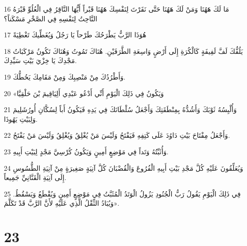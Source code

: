 \par 16 مَا لَكَ هَهُنَا وَمَنْ لَكَ هَهُنَا حَتَّى نَقَرْتَ لِنَفْسِكَ هَهُنَا قَبْراً أَيُّهَا النَّاقِرُ فِي الْعُلُوِّ قَبْرَهُ النَّاحِتُ لِنَفْسِهِ فِي الصَّخْرِ مَسْكَناً؟
\par 17 هُوَذَا الرَّبُّ يَطْرَحُكَ طَرْحاً يَا رَجُلُ وَيُغَطِّيكَ تَغْطِيَةً
\par 18 يَلُفُّكَ لَفَّ لَفِيفَةٍ كَالْكُرَةِ إِلَى أَرْضٍ وَاسِعَةِ الطَّرَفَيْنِ. هُنَاكَ تَمُوتُ وَهُنَاكَ تَكُونُ مَرْكَبَاتُ مَجْدِكَ يَا خِزْيَ بَيْتِ سَيِّدِكَ.
\par 19 وَأَطْرُدُكَ مِنْ مَنْصِبِكَ وَمِنْ مَقَامِكَ يَحُطُّكَ.
\par 20 «وَيَكُونُ فِي ذَلِكَ الْيَوْمِ أَنِّي أَدْعُو عَبْدِي أَلِيَاقِيمَ بْنَ حَلْقِيَّا
\par 21 وَأُلْبِسُهُ ثَوْبَكَ وَأَشُدُّهُ بِمِنْطَقَتِكَ وَأَجْعَلُ سُلْطَانَكَ فِي يَدِهِ فَيَكُونُ أَباً لِسُكَّانِ أُورُشَلِيمَ وَلِبَيْتِ يَهُوذَا.
\par 22 وَأَجْعَلُ مِفْتَاحَ بَيْتِ دَاوُدَ عَلَى كَتِفِهِ فَيَفْتَحُ وَلَيْسَ مَنْ يُغْلِقُ وَيُغْلِقُ وَلَيْسَ مَنْ يَفْتَحُ.
\par 23 وَأُثَبِّتُهُ وَتَداً فِي مَوْضِعٍ أَمِينٍ وَيَكُونُ كُرْسِيَّ مَجْدٍ لِبَيْتِ أَبِيهِ.
\par 24 وَيُعَلِّقُونَ عَلَيْهِ كُلَّ مَجْدِ بَيْتِ أَبِيهِ الْفُرُوعَ وَالْقُضْبَانَ كُلَّ آنِيَةٍ صَغِيرَةٍ مِنْ آنِيَةِ الطُّسُوسِ إِلَى آنِيَةِ الْقَنَّانِيِّ جَمِيعاً.
\par 25 فِي ذَلِكَ الْيَوْمِ يَقُولُ رَبُّ الْجُنُودِ يَزُولُ الْوَتَدُ الْمُثَبَّتُ فِي مَوْضِعٍ أَمِينٍ وَيُقْطَعُ وَيَسْقُطُ. وَيُبَادُ الثِّقْلُ الَّذِي عَلَيْهِ لأَنَّ الرَّبَّ قَدْ تَكَلَّمَ».

\chapter{23}

